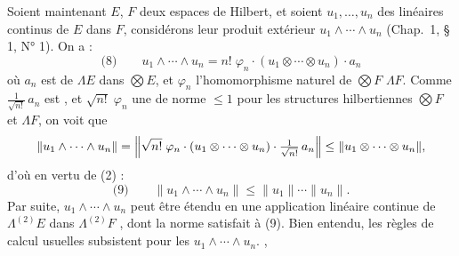 \documentclass[11pt,a4paper]{article}
\begin{document}
Soient maintenant $E$, $F$ deux espaces de Hilbert, et soient $u_1, \ldots, u_n$ des  linéaires continus de $E$ dans $F$, considérons leur produit extérieur $u_1 \wedge \cdots \wedge u_n$ (Chap.~1, § 1, N° 1). On a :
\[
  \text{(8)}\qquad u_1 \wedge \cdots \wedge u_n = n!\; \varphi_n \cdot (u_1 \otimes \cdots \otimes u_n) \cdot a_n
\]
où $a_n$ est  \struck{\ill{}}   de $\Lambda E$ dans $\bigotimes E$, et $\varphi_n$ l'homomorphisme naturel de $\bigotimes F$  $\Lambda F$. Comme $\frac{1}{\sqrt{n!}}\, a_n$ \ill{} est     , et $\sqrt{n!}\; \varphi_n$ une \ill{} de norme $\leq 1$ pour les structures hilbertiennes \ill{} $\bigotimes F$ et $\Lambda F$, on voit que
\[
  \|u_1 \wedge \cdots \wedge u_n\| = \Bigl\|\sqrt{n!}\; \varphi_n \cdot (u_1 \otimes \cdots \otimes u_n) \cdot \tfrac{1}{\sqrt{n!}}\, a_n\Bigr\| \leq \|u_1 \otimes \cdots \otimes u_n\|,
\]
d'où en vertu de (2) :
\[
  \text{(9)}\qquad \|u_1 \wedge \cdots \wedge u_n\| \leq \|u_1\| \cdots \|u_n\| .
\]
Par suite, $u_1 \wedge \cdots \wedge u_n$ peut être étendu en une application linéaire continue de $\Lambda^{(2)} E$ dans $\Lambda^{(2)} F$ , dont la norme satisfait à (9). Bien entendu, les règles de calcul usuelles subsistent pour les  \struck{\ill{}} $u_1 \wedge \cdots \wedge u_n$.  ,   
\end{document}
